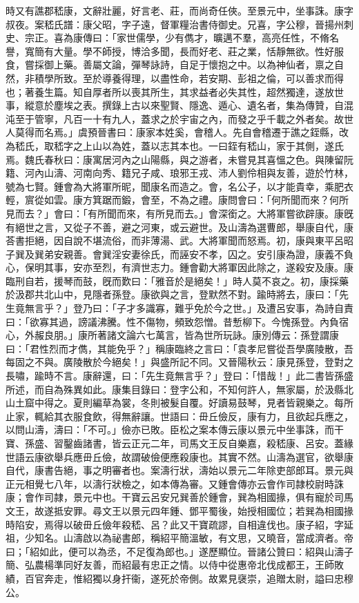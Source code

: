 \begin{pinyinscope}
時又有譙郡嵇康，文辭壯麗，好言老、莊，而尚奇任俠。至景元中，坐事誅。康字叔夜。案嵇氏譜：康父昭，字子遠，督軍糧治書侍御史。兄喜，字公穆，晉揚州刺史、宗正。喜為康傳曰：「家世儒學，少有儁才，曠邁不羣，高亮任性，不脩名譽，寬簡有大量。學不師授，博洽多聞，長而好老、莊之業，恬靜無欲。性好服食，嘗採御上藥。善屬文論，彈琴詠詩，自足于懷抱之中。以為神仙者，禀之自然，非積學所致。至於導養得理，以盡性命，若安期、彭祖之倫，可以善求而得也；著養生篇。知自厚者所以喪其所生，其求益者必失其性，超然獨達，遂放世事，縱意於塵埃之表。撰錄上古以來聖賢、隱逸、遁心、遺名者，集為傳贊，自混沌至于管寧，凡百一十有九人，蓋求之於宇宙之內，而發之乎千載之外者矣。故世人莫得而名焉。」虞預晉書曰：康家本姓奚，會稽人。先自會稽遷于譙之銍縣，改為嵇氏，取嵇字之上山以為姓，蓋以志其本也。一曰銍有嵇山，家于其側，遂氏焉。魏氏春秋曰：康寓居河內之山陽縣，與之游者，未嘗見其喜慍之色。與陳留阮籍、河內山濤、河南向秀、籍兄子咸、琅邪王戎、沛人劉伶相與友善，遊於竹林，號為七賢。鍾會為大將軍所昵，聞康名而造之。會，名公子，以才能貴幸，乘肥衣輕，賔從如雲。康方箕踞而鍛，會至，不為之禮。康問會曰：「何所聞而來？何所見而去？」會曰：「有所聞而來，有所見而去。」會深銜之。大將軍嘗欲辟康。康旣有絕世之言，又從子不善，避之河東，或云避世。及山濤為選曹郎，舉康自代，康荅書拒絕，因自說不堪流俗，而非薄湯、武。大將軍聞而怒焉。初，康與東平呂昭子巽及巽弟安親善。會巽淫安妻徐氏，而誣安不孝，囚之。安引康為證，康義不負心，保明其事，安亦至烈，有濟世志力。鍾會勸大將軍因此除之，遂殺安及康。康臨刑自若，援琴而鼓，旣而歎曰：「雅音於是絕矣！」時人莫不哀之。初，康採藥於汲郡共北山中，見隱者孫登。康欲與之言，登默然不對。踰時將去，康曰：「先生竟無言乎？」登乃曰：「子才多識寡，難乎免於今之世。」及遭呂安事，為詩自責曰：「欲寡其過，謗議沸騰。性不傷物，頻致怨憎。昔慙柳下。今愧孫登。內負宿心，外赧良朋。」康所著諸文論六七萬言，皆為世所玩詠。康別傳云：孫登謂康曰：「君性烈而才儁，其能免乎？」稱康臨終之言曰：「袁孝尼嘗從吾學廣陵散，吾每固之不與。廣陵散於今絕矣！」與盛所記不同。又晉陽秋云：康見孫登，登對之長嘯，踰時不言。康辭還，曰：「先生竟無言乎？」登曰：「惜哉！」此二書皆孫盛所述，而自為殊異如此。康集目錄曰：登字公和，不知何許人，無家屬，於汲縣北山土窟中得之。夏則編草為裳，冬則被髮自覆。好讀易鼓琴，見者皆親樂之。每所止家，輒給其衣服食飲，得無辭讓。世語曰：毌丘儉反，康有力，且欲起兵應之，以問山濤，濤曰：「不可。」儉亦已敗。臣松之案本傳云康以景元中坐事誅，而干寶、孫盛、習鑿齒諸書，皆云正元二年，司馬文王反自樂嘉，殺嵇康、呂安。蓋緣世語云康欲舉兵應毌丘儉，故謂破儉便應殺康也。其實不然。山濤為選官，欲舉康自代，康書告絕，事之明審者也。案濤行狀，濤始以景元二年除吏部郎耳。景元與正元相覺七八年，以濤行狀檢之，如本傳為審。又鍾會傳亦云會作司隷校尉時誅康；會作司隷，景元中也。干寶云呂安兄巽善於鍾會，巽為相國掾，俱有寵於司馬文王，故遂抵安罪。尋文王以景元四年鍾、鄧平蜀後，始授相國位；若巽為相國掾時陷安，焉得以破毌丘儉年殺嵇、呂？此又干寶疏謬，自相違伐也。康子紹，字延祖，少知名。山濤啟以為祕書郎，稱紹平簡溫敏，有文思，又曉音，當成濟者。帝曰；「紹如此，便可以為丞，不足復為郎也。」遂歷顯位。晉諸公贊曰：紹與山濤子簡、弘農楊準同好友善，而紹最有忠正之情。以侍中從惠帝北伐成都王，王師敗績，百官奔走，惟紹獨以身扞衞，遂死於帝側。故累見襃崇，追贈太尉，謚曰忠穆公。


\end{pinyinscope}
